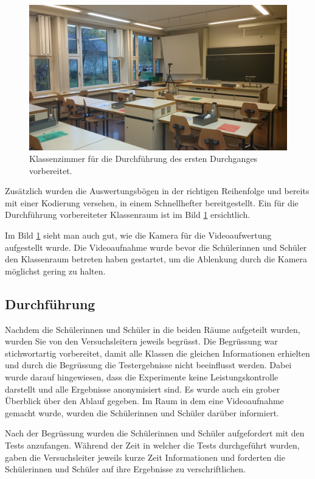 \begin{figure}[htb]
\centering
\includegraphics[width=0.7\linewidth]{graphics/Durchfuerhung}
\caption[Vorbereitetes Klassenzimmer.]{Klassenzimmer für die Durchführung des ersten Durchganges vorbereitet.}
\label{fig:Durchfuerhung}
\end{figure}

Zusätzlich wurden die Auswertungsbögen in der richtigen Reihenfolge und bereits mit einer Kodierung versehen, in einem Schnellhefter bereitgestellt. Ein für die Durchführung vorbereiteter Klassenraum ist im Bild \ref{fig:Durchfuerhung} ersichtlich.

Im Bild \ref{fig:Durchfuerhung} sieht man auch gut, wie die Kamera für die Videoaufwertung aufgestellt wurde. Die Videoaufnahme wurde bevor die Schülerinnen und Schüler den Klassenraum betreten haben gestartet, um die Ablenkung durch die Kamera möglichst gering zu halten.

\subsection{Durchführung}
Nachdem die Schülerinnen und Schüler in die beiden Räume aufgeteilt wurden, wurden Sie von den Versuchsleitern jeweils begrüsst. Die Begrüssung war stichwortartig vorbereitet, damit alle Klassen die gleichen Informationen erhielten und durch die Begrüssung die Testergebnisse nicht beeinflusst werden. Dabei wurde darauf hingewiesen, dass die Experimente keine Leistungskontrolle darstellt und alle Ergebnisse anonymisiert sind. Es wurde auch ein grober Überblick über den Ablauf gegeben. Im Raum in dem eine Videoaufnahme gemacht wurde, wurden die Schülerinnen und Schüler darüber informiert. 

Nach der Begrüssung wurden die Schülerinnen und Schüler aufgefordert mit den Tests anzufangen. Während der Zeit in welcher die Tests durchgeführt wurden, gaben die Versuchsleiter jeweils kurze Zeit Informationen und forderten die Schülerinnen und Schüler auf ihre Ergebnisse zu verschriftlichen.

